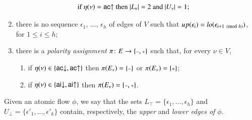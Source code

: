 \begin{definition}
\begin{enumerate}
\begin{align*}
\mbox{if $\eta(\nu)={{\mathsf{ac}}{\uparrow}}$ then $\mathord\vert L_\nu\mathord\vert=2$ and $\mathord\vert U_\nu\mathord\vert=1$;}&
\end{align*}
\item\label{ItAcycl} there is no sequence $\epsilon_1$, $\dots$, $\epsilon_h$ of edges of $V$ such that ${\mathit up}(\epsilon_i)={\mathit lo}(\epsilon_{i+1\pmod h})$, for $1\le i\le h$;
\item\label{definition:AtomicFlow:item:PolarityAssignment} there is a \emph{polarity assignment} $\pi\colon E\to\{\pmi,\ppl\}$ such that, for every $\nu\in V$,
\begin{enumerate}
\item if $\eta(\nu)\in\{{{\mathsf{ac}}{\downarrow}},{{\mathsf{ac}}{\uparrow}}\}$ then $\pi(E_\nu)=\{\pmi\}$ or $\pi(E_\nu)=\{\ppl\}$;
\item if $\eta(\nu)\in\{{{\mathsf{ai}}{\downarrow}},{{\mathsf{ai}}{\uparrow}}\}$ then $\pi(E_\nu)=\{\pmi,\ppl\}$.
\end{enumerate}
\end{enumerate}
Given an atomic flow $\phi$, we say that the sets $L_\top=\{\epsilon_1,\dots,\epsilon_h\}$ and $U_\bot=\{\epsilon'_1,\dots,\epsilon'_k\}$ contain, respectively, the \emph{upper} and \emph{lower edges of $\phi$}.
\end{definition}


